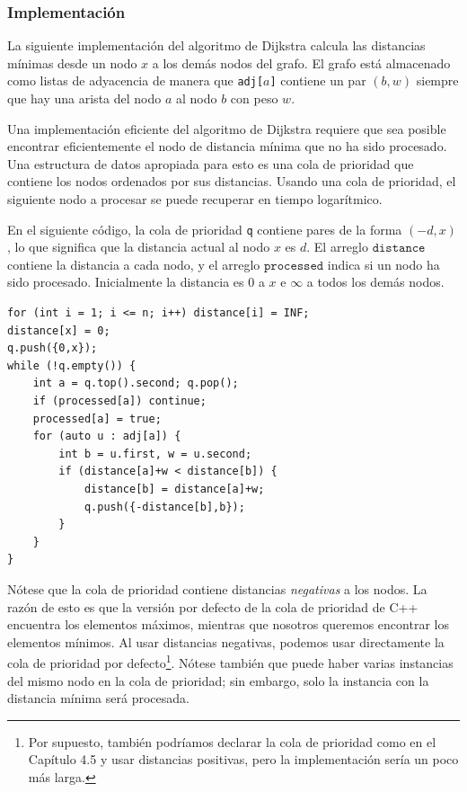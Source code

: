 \subsubsection{Implementación}

La siguiente implementación del algoritmo de Dijkstra
calcula las distancias mínimas desde un nodo $x$
a los demás nodos del grafo.
El grafo está almacenado como listas de adyacencia
de manera que \texttt{adj[$a$]} contiene un par $(b,w)$
siempre que hay una arista del nodo $a$ al nodo $b$
con peso $w$.

Una implementación eficiente del algoritmo de Dijkstra
requiere que sea posible encontrar eficientemente el
nodo de distancia mínima que no ha sido procesado.
Una estructura de datos apropiada para esto es una cola de prioridad
que contiene los nodos ordenados por sus distancias.
Usando una cola de prioridad, el siguiente nodo a procesar
se puede recuperar en tiempo logarítmico.

En el siguiente código, la cola de prioridad
\texttt{q} contiene pares de la forma $(-d,x)$,
lo que significa que la distancia actual al nodo $x$ es $d$.
El arreglo $\texttt{distance}$ contiene la distancia a
cada nodo, y el arreglo $\texttt{processed}$ indica
si un nodo ha sido procesado.
Inicialmente la distancia es $0$ a $x$ e $\infty$ a todos los demás nodos.

\begin{lstlisting}
for (int i = 1; i <= n; i++) distance[i] = INF;
distance[x] = 0;
q.push({0,x});
while (!q.empty()) {
    int a = q.top().second; q.pop();
    if (processed[a]) continue;
    processed[a] = true;
    for (auto u : adj[a]) {
        int b = u.first, w = u.second;
        if (distance[a]+w < distance[b]) {
            distance[b] = distance[a]+w;
            q.push({-distance[b],b});
        }
    }
}
\end{lstlisting}

Nótese que la cola de prioridad contiene distancias
\emph{negativas} a los nodos.
La razón de esto es que la
versión por defecto de la cola de prioridad de C++ encuentra los elementos
máximos, mientras que nosotros queremos encontrar los elementos mínimos.
Al usar distancias negativas,
podemos usar directamente la cola de prioridad por defecto\footnote{Por
supuesto, también podríamos declarar la cola de prioridad como en el Capítulo 4.5
y usar distancias positivas, pero la implementación sería un poco más larga.}.
Nótese también que puede haber varias instancias del mismo
nodo en la cola de prioridad; sin embargo, solo la instancia con la
distancia mínima será procesada.

